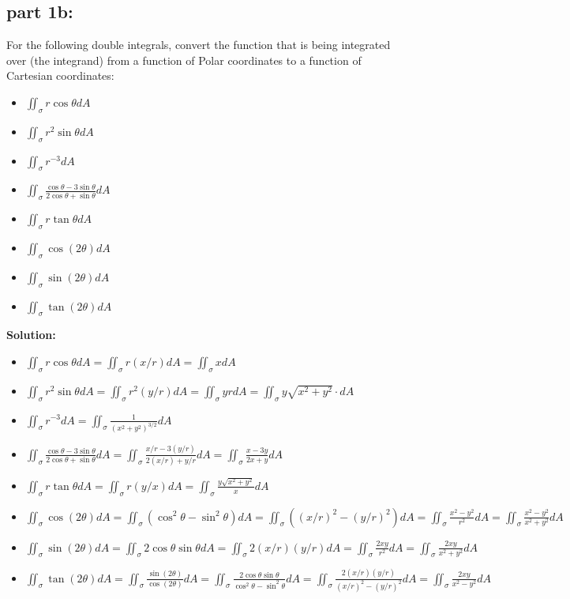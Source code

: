 \documentclass{article}
\newcommand{\dr}[1]{\textcolor{dark_red}{#1}}
\begin{document}
\subsection*{part 1b:}

For the following double integrals, convert the function that is being integrated over (the integrand) from a function of Polar coordinates to a function of Cartesian coordinates:

\begin{itemize}
\item \(\iint_{\sigma} r\cos\theta dA\)
\item \(\iint_{\sigma} r^2\sin\theta dA\)
\item \(\iint_{\sigma} r^{-3}dA\)
\item \(\iint_{\sigma} \frac{\cos\theta - 3\sin\theta}{2\cos\theta + \sin\theta}dA\)
\item \(\iint_{\sigma} r\tan\theta dA\)
\item \(\iint_{\sigma} \cos(2\theta) dA\)
\item \(\iint_{\sigma} \sin(2\theta) dA\)
\item \(\iint_{\sigma} \tan(2\theta) dA\)
\end{itemize}


\vspace{5mm}
\dr{\textbf{Solution:}}

\dr{
\begin{itemize}
\item \(\iint_{\sigma} r\cos\theta dA = \iint_{\sigma} r(x/r) dA = \iint_{\sigma} x dA\)
\item \(\iint_{\sigma} r^2\sin\theta dA = \iint_{\sigma} r^2(y/r) dA = \iint_{\sigma} yr dA = \iint_{\sigma} y\sqrt{x^2 + y^2} \cdot dA\)
\item \(\iint_{\sigma} r^{-3}dA = \iint_{\sigma} \frac{1}{(x^2 + y^2)^{3/2}}dA\)
\item \(\iint_{\sigma} \frac{\cos\theta - 3\sin\theta}{2\cos\theta + \sin\theta}dA = \iint_{\sigma} \frac{x/r - 3(y/r)}{2(x/r) + y/r}dA = \iint_{\sigma} \frac{x - 3y}{2x + y}dA\)
\item \(\iint_{\sigma} r\tan\theta dA = \iint_{\sigma} r(y/x) dA = \iint_{\sigma} \frac{y\sqrt{x^2 + y^2}}{x} dA\)
\item \(\iint_{\sigma} \cos(2\theta) dA = \iint_{\sigma} (\cos^2\theta - \sin^2\theta)dA = \iint_{\sigma} ((x/r)^2 - (y/r)^2)dA = \iint_{\sigma} \frac{x^2 - y^2}{r^2}dA = \iint_{\sigma} \frac{x^2 - y^2}{x^2 + y^2}dA\)
\item \(\iint_{\sigma} \sin(2\theta) dA = \iint_{\sigma} 2\cos\theta\sin\theta dA = \iint_{\sigma} 2(x/r)(y/r) dA = \iint_{\sigma} \frac{2xy}{r^2} dA = \iint_{\sigma} \frac{2xy}{x^2 + y^2} dA\)
\item \(\iint_{\sigma} \tan(2\theta) dA = \iint_{\sigma} \frac{\sin(2\theta)}{\cos(2\theta)} dA = \iint_{\sigma} \frac{2\cos\theta\sin\theta}{\cos^2\theta - \sin^2\theta} dA = \iint_{\sigma} \frac{2(x/r)(y/r)}{(x/r)^2 - (y/r)^2} dA = \iint_{\sigma} \frac{2xy}{x^2 - y^2} dA\)
\end{itemize}
}
\end{document}
